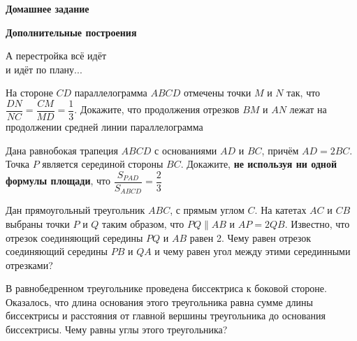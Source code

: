 \hspace{3mm}

\centerline{\Huge \bf Домашнее задание}
\centerline{\Huge \bf Дополнительные построения}

\begin{flushright}
    \scriptsize{А перестройка всё идёт\\
                и идёт по плану...}
\end{flushright}

\hspace{3mm}

 На стороне $CD$ параллелограмма $ABCD$ отмечены точки $M$ и $N$ так, что $\dfrac{DN}{NC} = \dfrac{CM}{MD} = \dfrac{1}{3}$. Докажите, что продолжения отрезков $BM$  и $AN$ лежат на продолжении средней линии параллелограмма

 Дана равнобокая трапеция $ABCD$ с основаниями $AD$ и $BC$, причём $AD = 2BC$. Точка $P$ является серединой стороны $BC$. Докажите, \textbf{не используя ни одной формулы площади}, что $\dfrac{S_{PAD}}{S_{ABCD}} = \dfrac{2}{3}$

 Дан прямоугольный треугольник $ABC$, с прямым углом $C$. На катетах $AC$ и $CB$ выбраны точки $P$ и $Q$ таким образом, что $PQ\parallel AB$ и $AP = 2QB$. Известно, что отрезок соединяющий середины $PQ$ и $AB$ равен 2. Чему равен отрезок соединяющий середины $PB$ и $QA$ и чему равен угол между этими серединными отрезками?

 В равнобедренном треугольнике проведена биссектриса к боковой стороне. Оказалось, что длина основания этого треугольника равна сумме длины биссектрисы и расстояния от главной вершины треугольника до основания биссектрисы. Чему равны углы этого треугольника?
